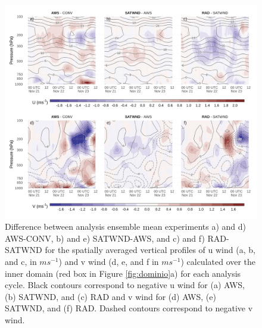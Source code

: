 \documentclass[final,5p,times,twocolumn,authoryear]{elsarticle} %
\begin{document}
\begin{figure}[ht]

{\centering \includegraphics{../figures/UV-diff-1} 

}

\caption{Difference between analysis ensemble mean experiments a) and d) AWS-CONV, b) and e) SATWND-AWS, and c) and f) RAD-SATWND for the spatially averaged vertical profiles of u wind (a, b, and c, in \(ms^{-1}\)) and v wind (d, e, and f in \(ms^{-1}\)) calculated over the inner domain (red box in Figure \ref{fig:dominio}a) for each analysis cycle. Black contours correspond to negative u wind for (a) AWS, (b) SATWND, and (c) RAD and v wind for (d) AWS, (e) SATWND, and (f) RAD. Dashed contours correspond to negative v wind.}\label{fig:UV-diff}
\end{figure}
\end{document}
